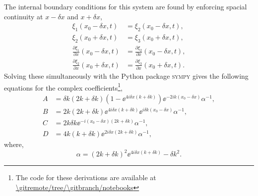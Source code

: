 The internal boundary conditions for this system are found by enforcing spacial continuity at \(x - \delta x\) and \(x + \delta x\),
%
\begin{align*}
    \xi_1(x_0 - \delta x, t) &= \xi_2(x_0 - \delta x, t), \\
    \xi_2(x_0 + \delta x, t) &= \xi_3(x_0 + \delta x, t), \\
    \frac{\partial \xi_1}{\partial x}(x_0 - \delta x, t) &= \frac{\partial \xi_2}{\partial x}(x_0 - \delta x, t), \\
    \frac{\partial \xi_2}{\partial x}(x_0 + \delta x, t) &= \frac{\partial \xi_3}{\partial x}(x_0 + \delta x, t).
\end{align*}
%
Solving these simultaneously with the Python package \textsc{sympy} gives the following equations for the complex coefficients\footnote{The code for these derivations are available at \url{\gitremote/tree/\gitbranch/notebooks}},
%
\begin{align}
    A &= \delta k (2k + \delta k) (1 - \ee^{4i \delta x (k + \delta k)}) \ee^{- 2i k (x_0 - \delta x)} \alpha^{-1}, \\
    B &= 2 k (2k + \delta k) \ee^{4i \delta x (k + \delta k)} \ee^{i \delta k (x_0 - \delta x)} \alpha^{-1}, \\
    C &= 2 k \delta k \ee^{- i (x_0 - \delta x) (2k + \delta k)} \alpha^{-1}, \\
    D &= 4 k (k + \delta k) \ee^{2 i \delta x (2k + \delta k)} \alpha^{-1},
\end{align}
%
where,
\begin{equation}
    \alpha = (2k + \delta k)^2 \ee^{4 i \delta x (k + \delta k)} - \delta k^2.
\end{equation}
%

